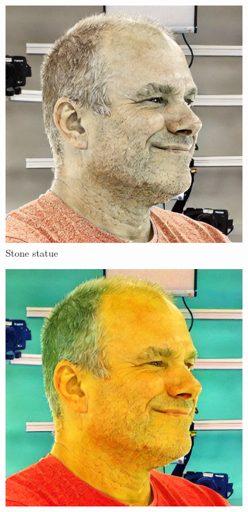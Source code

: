 \begin{figure}[ht]
\begin{subfigure}{0.18\linewidth}
        \includegraphics[width=\textwidth]{Figures/naive/low_cfg/ipix2pix_sven_stone/0-4-5-1-5648_230239_266.png}
    \caption{Stone statue}
	\end{subfigure}
    \begin{subfigure}{0.18\linewidth}
        \includegraphics[width=\textwidth]{Figures/naive/default/ipix2pix_sven_fauvism/0-4-5-1-5648_230239_266.png}

\end{subfigure}
\end{figure}
